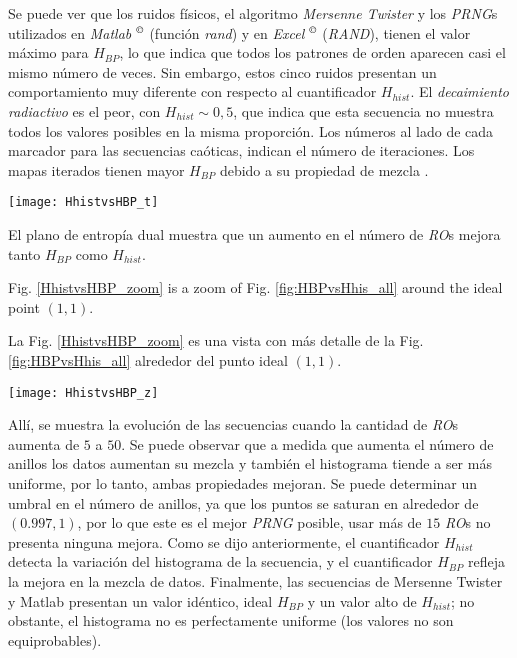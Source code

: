 Se puede ver que los ruidos físicos, el algoritmo \emph{Mersenne Twister} y los \emph{PRNG}s utilizados en \emph{Matlab} $^\copyright$ (función \emph{rand}) y en \emph{Excel} $^\copyright$ (\emph{RAND}), tienen el valor máximo para $H_{BP}$, lo que indica que todos los patrones de orden aparecen casi el mismo número de veces.
Sin embargo, estos cinco ruidos presentan un comportamiento muy diferente con respecto al cuantificador $H_{hist}$.
El \emph{decaimiento radiactivo} es el peor, con $H_ {hist} \sim 0,5$, que indica que esta secuencia no muestra todos los valores posibles en la misma proporción.
Los números al lado de cada marcador para las secuencias caóticas, indican el número de iteraciones.
Los mapas iterados tienen mayor $H_{BP}$ debido a su propiedad de mezcla \cite{DeMicco2008}.
%
\begin{figure*}
\begin{center}
\texttt{[image: HhistvsHBP\_t]}
\caption{Plano $H_{hist} \times H_{BP}$ para distintos RNGs. Los números que siguen a cada cuadrado indica la cantidad de \emph{RO}s utilizado en cada \emph{TRNG}.
Los números al lado de cada punto en las secuencias caóticas \emph{Logistic} y \emph{TWBM} indican el número de iteración para el mapa caótico (ver texto).}
\label{fig:HBPvsHhis_all}
\end{center}
\end{figure*}

El plano de entropía dual muestra que un aumento en el número de \emph{RO}s mejora tanto $H_ {BP}$ como $H_ {hist}$.

Fig. \ref{HhistvsHBP_zoom} is a zoom of Fig. \ref{fig:HBPvsHhis_all}  around the ideal point $(1,1)$.

La Fig. \ref{HhistvsHBP_zoom} es una vista con más detalle de la Fig. \ref{fig:HBPvsHhis_all} alrededor del punto ideal $(1,1)$.
%
\begin{figure*}
\begin{center}
\texttt{[image: HhistvsHBP\_z]}
\caption{Detalle de la Fig. \ref{fig:HBPvsHhis_all} alrededor del punto ideal $(1,1)$.}
\label{HhistvsHBP_zoom}
\end{center}
\end{figure*}
%
Allí, se muestra la evolución de las secuencias cuando la cantidad de \emph{RO}s aumenta de $5$ a $50$.
Se puede observar que a medida que aumenta el número de anillos los datos aumentan su mezcla y también el histograma tiende a ser más uniforme, por lo tanto, ambas propiedades mejoran.
Se puede determinar un umbral en el número de anillos, ya que los puntos se saturan en alrededor de $(0.997,1)$, por lo que este es el mejor \emph{PRNG} posible, usar más de $15$ \emph{RO}s no presenta ninguna mejora.
Como se dijo anteriormente, el cuantificador $H_ {hist}$ detecta la variación del histograma de la secuencia, y el cuantificador $ H_ {BP} $ refleja la mejora en la mezcla de datos.
Finalmente, las secuencias de Mersenne Twister y Matlab presentan un valor idéntico, ideal $H_ {BP}$ y un valor alto de $H_ {hist}$; no obstante, el histograma no es perfectamente uniforme (los valores no son equiprobables).

